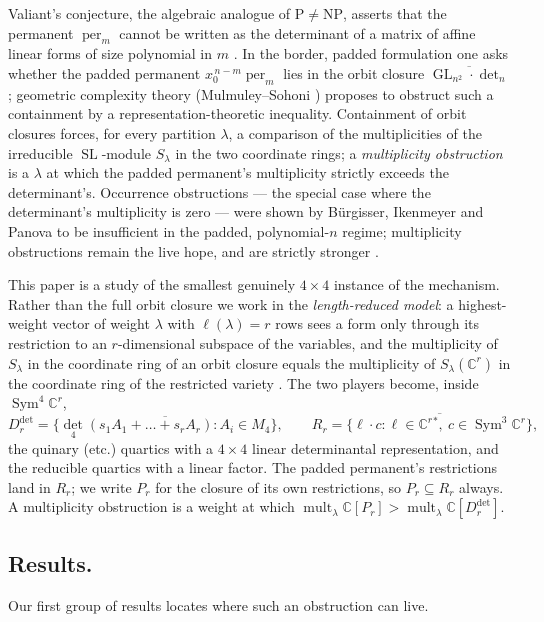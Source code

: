 \documentclass[11pt]{amsart}
\theoremstyle{plain}
\theoremstyle{definition}
\theoremstyle{remark}
\DeclareMathOperator{\GL}{GL}
\DeclareMathOperator{\SL}{SL}
\DeclareMathOperator{\Sym}{Sym}
\DeclareMathOperator{\mult}{mult}
\DeclareMathOperator{\per}{per}
\newcommand{\bC}{\mathbb{C}}
\newcommand{\Rr}{R}
\newcommand{\Pp}{P}
\newcommand{\Ddet}{D^{\det}}
\begin{document}
Valiant's conjecture, the algebraic analogue of $\mathrm{P}\neq\mathrm{NP}$,
asserts that the permanent $\per_m$ cannot be written as the determinant of a
matrix of affine linear forms of size polynomial in $m$
\cite{Valiant,MS,BI,Landsberg}.  In the border, padded formulation one asks
whether the padded permanent $x_0^{\,n-m}\per_m$ lies in the orbit closure
$\overline{\GL_{n^2}\cdot\det_n}$; geometric complexity theory
(Mulmuley--Sohoni \cite{MS}) proposes to obstruct such a containment by a
representation-theoretic inequality.  Containment of orbit closures forces, for
every partition $\lambda$, a comparison of the multiplicities of the
irreducible $\SL$-module $S_\lambda$ in the two coordinate rings; a
\emph{multiplicity obstruction} is a $\lambda$ at which the padded permanent's
multiplicity strictly exceeds the determinant's.  Occurrence obstructions --- the
special case where the determinant's multiplicity is zero --- were shown by
B\"urgisser, Ikenmeyer and Panova \cite{BIP} to be insufficient in the padded,
polynomial-$n$ regime; multiplicity obstructions remain the live hope, and are
strictly stronger \cite{DIP}.

This paper is a study of the smallest genuinely $4\times4$ instance of the
mechanism.  Rather than the full orbit closure we work in the
\emph{length-reduced model}: a highest-weight vector of weight $\lambda$ with
$\ell(\lambda)=r$ rows sees a form only through its restriction to an
$r$-dimensional subspace of the variables, and the multiplicity of $S_\lambda$
in the coordinate ring of an orbit closure equals the multiplicity of
$S_\lambda(\bC^r)$ in the coordinate ring of the restricted variety
\cite[\S4]{Companion}.  The two players become, inside $\Sym^{4}\bC^{r}$,
\[
  \Ddet_r=\overline{\{\det_4(s_1A_1+\dots+s_rA_r):A_i\in M_4\}},
  \qquad
  \Rr_r=\overline{\{\ell\cdot c:\ell\in\bC^r{}^{*},\ c\in\Sym^{3}\bC^{r}\}},
\]
the quinary (etc.) quartics with a $4\times4$ linear determinantal
representation, and the reducible quartics with a linear factor.  The padded
permanent's restrictions land in $\Rr_r$; we write $\Pp_r$ for the closure of
its own restrictions, so $\Pp_r\subseteq\Rr_r$ always.  A multiplicity
obstruction is a weight at which $\mult_\lambda\bC[\Pp_r]>\mult_\lambda\bC[\Ddet_r]$.

\subsection*{Results.}
Our first group of results locates where such an obstruction can live.
\end{document}
